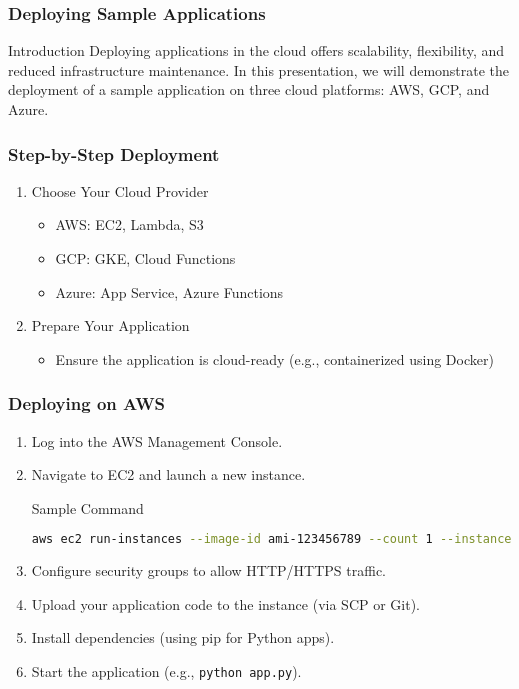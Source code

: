 \documentclass{beamer}
\begin{document}
\begin{frame}
    \frametitle{Deploying Sample Applications}
    \begin{block}{Introduction}
        Deploying applications in the cloud offers scalability, flexibility, and reduced infrastructure maintenance. 
        In this presentation, we will demonstrate the deployment of a sample application on three cloud platforms: AWS, GCP, and Azure.
    \end{block}
\end{frame}

\begin{frame}
    \frametitle{Step-by-Step Deployment}
    \begin{enumerate}
        \item Choose Your Cloud Provider
        \begin{itemize}
            \item AWS: EC2, Lambda, S3
            \item GCP: GKE, Cloud Functions
            \item Azure: App Service, Azure Functions
        \end{itemize}
        \item Prepare Your Application
        \begin{itemize}
            \item Ensure the application is cloud-ready (e.g., containerized using Docker)
        \end{itemize}
    \end{enumerate}
\end{frame}

\begin{frame}[fragile]
    \frametitle{Deploying on AWS}
    \begin{enumerate}
        \item Log into the AWS Management Console.
        \item Navigate to EC2 and launch a new instance.
        \begin{block}{Sample Command}
            \begin{lstlisting}[language=bash]
aws ec2 run-instances --image-id ami-123456789 --count 1 --instance-type t2.micro --key-name MyKeyPair
            \end{lstlisting}
        \end{block}
        \item Configure security groups to allow HTTP/HTTPS traffic.
        \item Upload your application code to the instance (via SCP or Git).
        \item Install dependencies (using pip for Python apps).
        \item Start the application (e.g., \texttt{python app.py}).
    \end{enumerate}
\end{frame}
\end{document}
